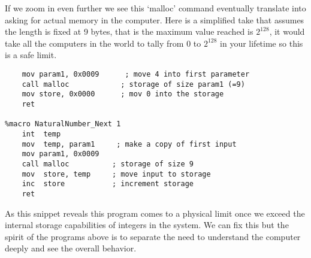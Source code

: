 If we zoom in even further we see this `malloc' command eventually 
translate into asking for actual memory in the computer.  Here is a
simplified take that assumes the length is fixed at 9 bytes, that is 
the maximum value reached is $2^{128}$, it would take all the computers 
in the world to tally from $0$ to $2^{128}$ in your lifetime so 
this is a safe limit.
\begin{center}
\begin{lstlisting}[language={ [x86masm]Assembler}]
%macro NaturalNumber_Zero 0
    mov param1, 0x0009      ; move 4 into first parameter
    call malloc            ; storage of size param1 (=9)
    mov store, 0x0000      ; mov 0 into the storage
    ret 

%macro NaturalNumber_Next 1
    int  temp
    mov  temp, param1     ; make a copy of first input
    mov param1, 0x0009      
    call malloc          ; storage of size 9
    mov  store, temp     ; move input to storage
    inc  store           ; increment storage 
    ret 
\end{lstlisting}
\end{center}

As this snippet reveals this program comes to a physical limit 
once we exceed the internal storage capabilities of integers in the
system.  We can fix this but the spirit of the programs above 
is to separate the need to understand the computer deeply and see the 
overall behavior.
